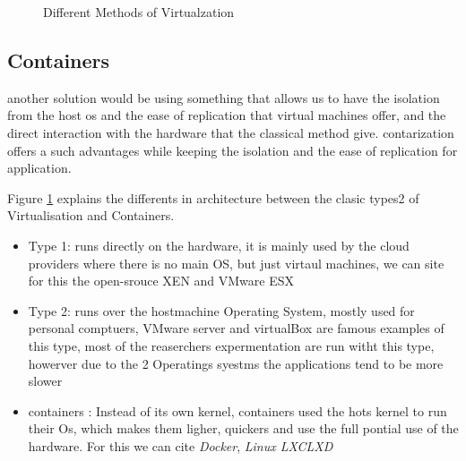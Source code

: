 
\begin{figure}
    \caption{Different Methods of Virtualzation}\label{reproducibility:virtualization_technique}
\end{figure}

\subsection{Containers}

another solution would be using something that allows us to have the isolation from the host os and the ease of replication that virtual machines offer, and the direct interaction with the hardware that the classical method give.
contarization offers a such advantages while keeping the isolation and the ease of replication for application.

Figure \ref{reproducibility:virtualization_technique} explains the differents in architecture between the clasic types2 of Virtualisation and Containers.
\begin{itemize}
    \item Type 1: runs directly on the hardware, it is mainly used by the cloud providers where there is no main OS, but just virtaul machines, we can site for this the open-srouce XEN and VMware ESX
    \item Type 2: runs over the hostmachine Operating System, mostly used for personal comptuers, VMware server and virtualBox are famous examples of this type, most of the reaserchers expermentation are run witht this type, howerver due to the 2 Operatings syestms the applications tend to be more slower
    \item containers : Instead of its own kernel, containers used the hots kernel to run their Os, which makes them ligher, quickers and use the full pontial use of the hardware. For this we can cite \emph{Docker}, \emph{Linux LXC}\emph{LXD} \cite{abuabdo_virtualization_2019}
\end{itemize}


